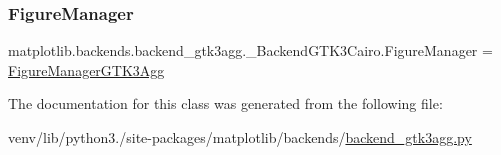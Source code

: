 \subsubsection{\texorpdfstring{Figure\+Manager}{FigureManager}}
{\footnotesize\ttfamily matplotlib.\+backends.\+backend\+\_\+gtk3agg.\+\_\+\+Backend\+G\+T\+K3\+Cairo.\+Figure\+Manager = \hyperlink{classmatplotlib_1_1backends_1_1backend__gtk3agg_1_1FigureManagerGTK3Agg}{Figure\+Manager\+G\+T\+K3\+Agg}\hspace{0.3cm}{\ttfamily [static]}}



The documentation for this class was generated from the following file\+:\begin{DoxyCompactItemize}
\item 
venv/lib/python3./site-\/packages/matplotlib/backends/\hyperlink{backend__gtk3agg_8py}{backend\+\_\+gtk3agg.\+py}\end{DoxyCompactItemize}
